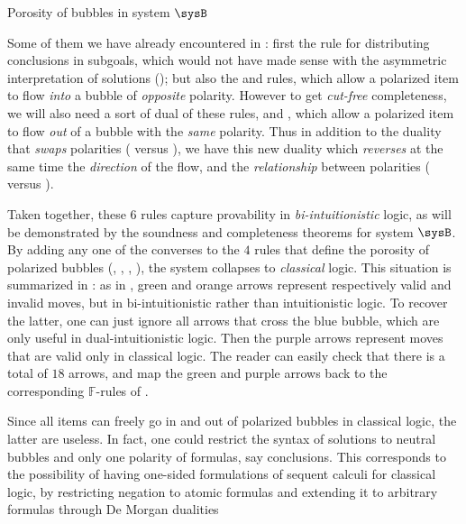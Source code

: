 \begin{description}
  \begin{marginfigure}
    \caption{Porosity of bubbles in system $\sysB$}
  \end{marginfigure}
  
  Some of them we have already encountered in : first the
   rule for distributing conclusions in subgoals, which
  would not have made sense with the asymmetric interpretation of solutions
  (); but also the  and
   rules, which allow a polarized item to flow
  \emph{into} a bubble of \emph{opposite} polarity. However to get
  \emph{cut-free} completeness, we will also need a sort of dual of these rules,
   and , which allow a polarized
  item to flow \emph{out} of a bubble with the \emph{same} polarity. Thus in
  addition to the duality that \emph{swaps} polarities
  ( versus ), we have this new
  duality which \emph{reverses} at the same time the \emph{direction} of the
  flow, and the \emph{relationship} between polarities
  ( versus ).

  Taken together, these $6$ rules capture provability in
  \emph{bi-intuitionistic} logic, as will be demonstrated by the soundness and
  completeness theorems for system $\sysB$. By adding any one of the converses
  to the $4$ rules that define the porosity of polarized bubbles
  (, , ,
  ), the system collapses to \emph{classical} logic.
  This situation is summarized in : as in
  , green and orange arrows represent respectively valid
  and invalid moves, but in bi-intuitionistic rather than intuitionistic logic.
  To recover the latter, one can just ignore all arrows that cross the blue
  bubble, which are only useful in dual-intuitionistic logic. Then the purple
  arrows represent moves that are valid only in classical logic. The reader can
  easily check that there is a total of $18$ arrows, and map the green and
  purple arrows back to the corresponding $\mathbb{F}$-rules of
  .

  \begin{remark}
    Since all items can freely go in and out of polarized bubbles in classical
    logic, the latter are useless. In fact, one could restrict the syntax of
    solutions to neutral bubbles and only one polarity of formulas, say
    conclusions. This corresponds to the possibility of having one-sided
    formulations of sequent calculi for classical logic, by restricting negation
    to atomic formulas and extending it to arbitrary formulas through De Morgan
    dualities
  \end{remark}
  

\end{description}

